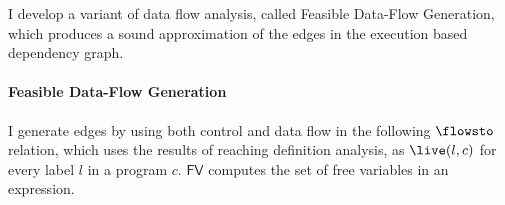 I develop a variant of data flow analysis, called Feasible Data-Flow Generation, which produces a sound approximation of the edges in the execution based dependency graph.
\paragraph{Feasible Data-Flow Generation}
 I generate edges by using both control and data flow in the following $\flowsto$ relation, which uses the results of reaching definition analysis, as $\live(l, c)$ for every label $l$ in a program $c$. $\mathsf{FV}$ computes the set of free variables in an expression. 
%
%
